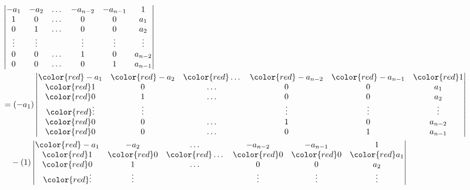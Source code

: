 \documentclass{report}
\theoremstyle{remark}
\begin{document}
  \begingroup
  \allowdisplaybreaks
  \begin{align}
    &\begin{vmatrix}
      - a_1
      &- a_2
      &\dots
      &- a_{n - 2}
      &- a_{n - 1}
      &1
      \\
      1
      &0
      &\dots
      &0
      &0
      &a_1
      \\
      0
      &1
      &\dots
      &0
      &0
      &a_2
      \\
      \vdots
      &\vdots
      &
      &\vdots
      &\vdots
      &\vdots
      \\
      0
      &0
      &\dots
      &1
      &0
      &a_{n - 2}
      \\
      0
      &0
      &\dots
      &0
      &1
      &a_{n - 1}
    \end{vmatrix}
    \\
    &=
    (- a_1)
    \begin{vmatrix}
      \color{red} - a_1
      &\color{red} - a_2
      &\color{red} \dots
      &\color{red} - a_{n - 2}
      &\color{red} - a_{n - 1}
      &\color{red} 1
      \\
      \color{red} 1
      &0
      &\dots
      &0
      &0
      &a_1
      \\
      \color{red} 0
      &1
      &\dots
      &0
      &0
      &a_2
      \\
      \color{red} \vdots
      &\vdots
      &
      &\vdots
      &\vdots
      &\vdots
      \\
      \color{red} 0
      &0
      &\dots
      &1
      &0
      &a_{n - 2}
      \\
      \color{red} 0
      &0
      &\dots
      &0
      &1
      &a_{n - 1}
    \end{vmatrix}
    \\
    &\quad
      - (1)
      \begin{vmatrix}
        \color{red} - a_1
        &- a_2
        &\dots
        &- a_{n - 2}
        &- a_{n - 1}
        &1
        \\
        \color{red} 1
        &\color{red} 0
        &\color{red} \dots
        &\color{red} 0
        &\color{red} 0
        &\color{red} a_1
        \\
        \color{red} 0
        &1
        &\dots
        &0
        &0
        &a_2
        \\
        \color{red} \vdots
        &\vdots
        &
        &\vdots
        &\vdots
        &\vdots
        \\

\end{vmatrix}
\end{align}
\end{document}
